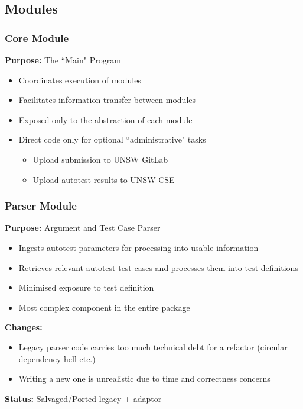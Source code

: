 \documentclass[xcolor, handout]{beamer}
\begin{document}
\subsection{Modules}
\begin{frame}
	\frametitle{Core Module}
	\textbf{Purpose:} The ``Main" Program\\
	\begin{itemize}
		\item Coordinates execution of modules
			\pause
		\item Facilitates information transfer between modules
			\pause
		\item Exposed only to the abstraction of each module
			\pause
		\item Direct code only for optional ``administrative" tasks
			\begin{itemize}
				\item Upload submission to UNSW GitLab
					\pause
				\item Upload autotest results to UNSW CSE
			\end{itemize}
	\end{itemize}
\end{frame}

\begin{frame}
	\frametitle{Parser Module}
	\textbf{Purpose:} Argument and Test Case Parser\\
	\begin{itemize}
		\item Ingests autotest parameters for processing into usable information
			\pause
		\item Retrieves relevant autotest test cases and processes them into test definitions
			\pause
		\item Minimised exposure to test definition
			\pause
		\item Most complex component in the entire package
			\pause
	\end{itemize}
	\textbf{Changes:}
	\begin{itemize}
		\item Legacy parser code carries too much technical debt for a refactor (circular dependency hell etc.)
			\pause
		\item Writing a new one is unrealistic due to time and correctness concerns
			\pause
	\end{itemize}
	\textbf{Status:} Salvaged/Ported legacy + adaptor
\end{frame}
\end{document}
